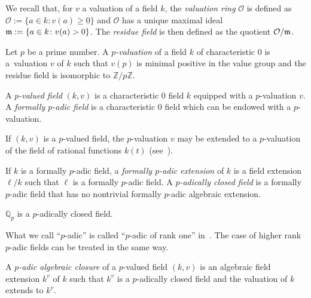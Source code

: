 \documentclass[pdftex]{sigma}%
\numberwithin{equation}{section}
\newcommand{\Z}{\mathbb{Z}}
\newcommand{\Q}{\mathbb{Q}}
\begin{document}
We recall that, for $v$ a valuation of a field $k$, the \emph{valuation ring} $\mathcal{O}$ is defined as $\mathcal{O}:=\{a \in k \colon v(a) \geq 0 \}$ and $\mathcal{O}$ has a unique maximal ideal $\frak{m}:= \{a \in k \colon v(a) > 0 \}$. The \emph{residue field} is then defined as the quotient $\mathcal{O}/\frak{m}$.



\begin{Definition}
Let $p$ be a prime number. A \emph{$p$-valuation} of a field $k$ of characteristic 0 is a~valuation $v$ of $k$
such that $v(p)$ is minimal positive in the value group and the residue field is isomorphic to $\Z/p\Z$.

A \emph{$p$-valued field} $(k,v)$ is a characteristic 0 field $k$ equipped with a $p$-valuation $v$. A \emph{formally $p$-adic field} is a characteristic 0 field which can be endowed with a $p$-valuation.
\end{Definition}

\begin{Remark}\label{val} If $(k,v)$ is a $p$-valued field, the $p$-valuation $v$ may be extended to a $p$-valuation of the field of rational functions $k(t)$ (see~\cite[Example~2.2]{PR}).
\end{Remark}

\begin{Definition} If $k$ is a formally $p$-adic field, a \emph{formally $p$-adic extension} of $k$ is a field extension $\ell/k$ such that $\ell$ is a formally $p$-adic field. A \emph{$p$-adically closed field} is a formally $p$-adic field that has no nontrivial formally $p$-adic algebraic extension.
\end{Definition}


\begin{Example} $\Q_p$ is a $p$-adically closed field.
\end{Example}

\begin{Remark} What we call ``$p$-adic'' is called ``$p$-adic of rank one'' in~\cite{PR}. The case of higher rank $p$-adic fields
can be treated in the same way.
\end{Remark}

\begin{Definition} A \emph{$p$-adic algebraic closure} of a $p$-valued field $(k,v)$ is an algebraic field extension $k^v$ of $k$ such that $k^v$ is a $p$-adically closed field and the valuation of $k$ extends to $k^v$.
\end{Definition}
\end{document}
